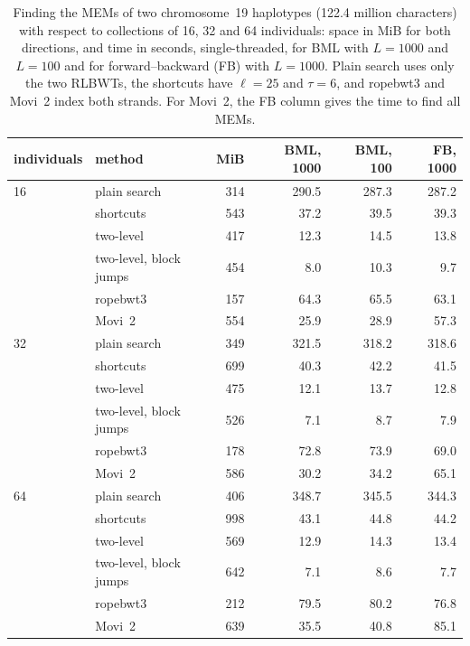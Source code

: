 \begin{table}[t]
  \centering
  \caption{Finding the MEMs of two chromosome~19 haplotypes (122.4
    million characters) with respect to collections of 16, 32 and 64
    individuals: space in MiB for both directions, and time in seconds,
    single-threaded, for BML with $L = 1000$ and $L = 100$ and for
    forward--backward (FB) with $L = 1000$. Plain search uses only the
    two RLBWTs, the shortcuts have $\ell = 25$ and $\tau = 6$, and
    ropebwt3 and Movi~2 index both strands. For Movi~2, the FB column
    gives the time to find all MEMs.}
  \label{tab:main}
  \begin{tabular}{l l r rrr}
    \toprule
    individuals & method & MiB & BML, 1000 & BML, 100 & FB, 1000 \\
    \midrule
    16 & plain search            & 314 & 290.5 & 287.3 & 287.2 \\
       & shortcuts               & 543 & 37.2 & 39.5 & 39.3 \\
       & two-level               & 417 & 12.3 & 14.5 & 13.8 \\
       & two-level, block jumps  & 454 & 8.0 & 10.3 & 9.7 \\
       & ropebwt3                & 157 & 64.3 & 65.5 & 63.1 \\
       & Movi~2                  & 554 & 25.9 & 28.9 & 57.3 \\
    \midrule
    32 & plain search            & 349 & 321.5 & 318.2 & 318.6 \\
       & shortcuts               & 699 & 40.3 & 42.2 & 41.5 \\
       & two-level               & 475 & 12.1 & 13.7 & 12.8 \\
       & two-level, block jumps  & 526 & 7.1 & 8.7 & 7.9 \\
       & ropebwt3                & 178 & 72.8 & 73.9 & 69.0 \\
       & Movi~2                  & 586 & 30.2 & 34.2 & 65.1 \\
    \midrule
    64 & plain search            & 406 & 348.7 & 345.5 & 344.3 \\
       & shortcuts               & 998 & 43.1 & 44.8 & 44.2 \\
       & two-level               & 569 & 12.9 & 14.3 & 13.4 \\
       & two-level, block jumps  & 642 & 7.1 & 8.6 & 7.7 \\
       & ropebwt3                & 212 & 79.5 & 80.2 & 76.8 \\
       & Movi~2                  & 639 & 35.5 & 40.8 & 85.1 \\
    \bottomrule
  \end{tabular}
\end{table}

